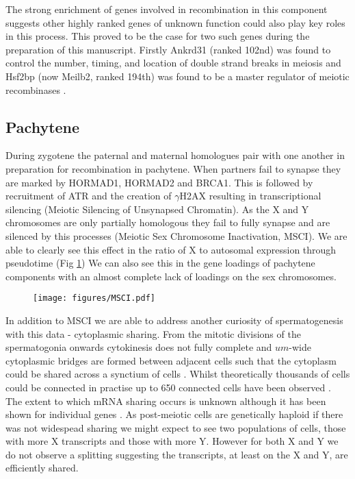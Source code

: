 The strong enrichment of genes involved in recombination in this component suggests other highly ranked genes of unknown function could also play key roles in this process. This proved to be the case for two such genes during the preparation of this manuscript. Firstly Ankrd31 (ranked 102nd) was found to control the number, timing, and location of double strand breaks in meiosis \cite{Boekhout2018REC114, Papanikos2018ANKRD31} and Hsf2bp (now Meilb2, ranked 194th) was found to be a master regulator of meiotic recombinases \cite{Zhang2019meiosisspecific}.


\subsection{Pachytene}
During zygotene the paternal and maternal homologues pair with one another in preparation for recombination in pachytene. When partners fail to synapse they are marked by HORMAD1, HORMAD2 and BRCA1. This is followed by recruitment of ATR and the creation of $\gamma$H2AX resulting in transcriptional silencing (Meiotic Silencing of Unsynapsed Chromatin). As the X and Y chromosomes are only partially homologous they fail to fully synapse and are silenced by this processes (Meiotic Sex Chromosome Inactivation, MSCI). We are able to clearly see this effect in the ratio of X to autosomal expression through pseudotime (Fig \ref{fig:MSCI}) We can also see this in the gene loadings of pachytene components with an almost complete lack of loadings on the sex chromosomes.

\begin{figure}[H]
	\centering
	\texttt{[image: figures/MSCI.pdf]}
	\caption{}
	\label{fig:MSCI}
\end{figure}

In addition to MSCI we are able to address another curiosity of spermatogenesis with this data - cytoplasmic sharing. From the mitotic divisions of the spermatogonia onwards cytokinesis does not fully complete and $um$-wide cytoplasmic bridges are formed between adjacent cells such that the cytoplasm could be shared across a synctium of cells \cite{Greenbaum2011Germ}. Whilst theoretically thousands of cells could be connected in practise up to 650 connected cells have been observed \cite{Ren1991Clonal}. The extent to which mRNA sharing occurs is unknown although it has been shown for individual genes \cite{Braun1989Genetically}. As post-meiotic cells are genetically haploid if there was not widespead sharing we might expect to see two populations of cells, those with more X transcripts and those with more Y. However for both X and Y we do not observe a splitting suggesting the transcripts, at least on the X and Y, are efficiently shared.


